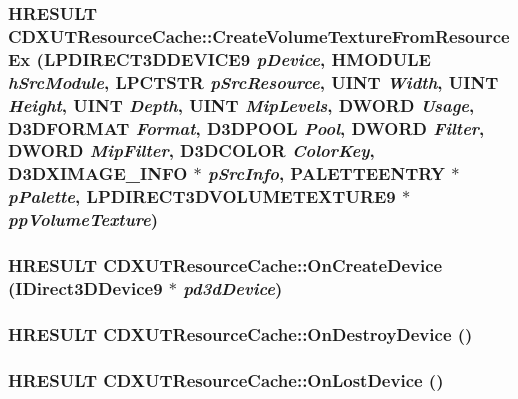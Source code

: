 \label{class_c_d_x_u_t_resource_cache_aa016831002fa2b54bd7cea38072c9a5c}
\hypertarget{class_c_d_x_u_t_resource_cache_a0ffaceddcccad20ae27475f698bd884d}{
\subsubsection[{CreateVolumeTextureFromResourceEx}]{\setlength{\rightskip}{0pt plus 5cm}HRESULT CDXUTResourceCache::CreateVolumeTextureFromResourceEx (LPDIRECT3DDEVICE9 {\em pDevice}, \/  HMODULE {\em hSrcModule}, \/  LPCTSTR {\em pSrcResource}, \/  UINT {\em Width}, \/  UINT {\em Height}, \/  UINT {\em Depth}, \/  UINT {\em MipLevels}, \/  DWORD {\em Usage}, \/  D3DFORMAT {\em Format}, \/  D3DPOOL {\em Pool}, \/  DWORD {\em Filter}, \/  DWORD {\em MipFilter}, \/  D3DCOLOR {\em ColorKey}, \/  D3DXIMAGE\_\-INFO $\ast$ {\em pSrcInfo}, \/  PALETTEENTRY $\ast$ {\em pPalette}, \/  LPDIRECT3DVOLUMETEXTURE9 $\ast$ {\em ppVolumeTexture})}}
\label{class_c_d_x_u_t_resource_cache_a0ffaceddcccad20ae27475f698bd884d}
\hypertarget{class_c_d_x_u_t_resource_cache_ae502f51b236a110cd2d7470065d284b8}{
\subsubsection[{OnCreateDevice}]{\setlength{\rightskip}{0pt plus 5cm}HRESULT CDXUTResourceCache::OnCreateDevice (IDirect3DDevice9 $\ast$ {\em pd3dDevice})}}
\label{class_c_d_x_u_t_resource_cache_ae502f51b236a110cd2d7470065d284b8}
\hypertarget{class_c_d_x_u_t_resource_cache_ac91b24c21474e187e21099c72583946e}{
\subsubsection[{OnDestroyDevice}]{\setlength{\rightskip}{0pt plus 5cm}HRESULT CDXUTResourceCache::OnDestroyDevice ()}}
\label{class_c_d_x_u_t_resource_cache_ac91b24c21474e187e21099c72583946e}
\hypertarget{class_c_d_x_u_t_resource_cache_abaf5192e33946915a9d1a3098ffdd17a}{
\subsubsection[{OnLostDevice}]{\setlength{\rightskip}{0pt plus 5cm}HRESULT CDXUTResourceCache::OnLostDevice ()}}
